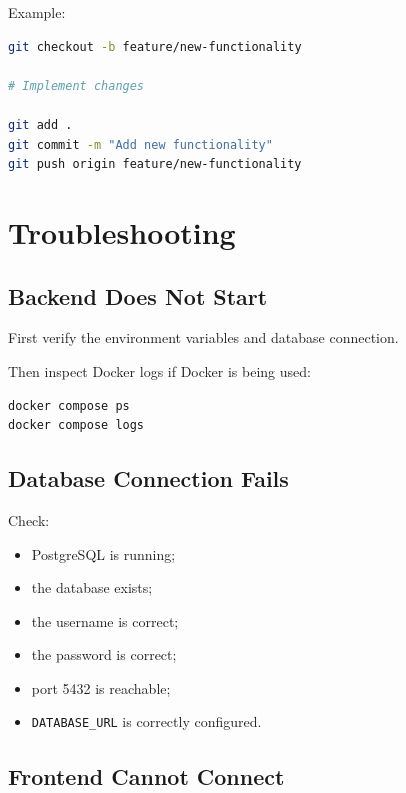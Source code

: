 \documentclass[12pt,a4paper]{article}
\begin{document}
Example:

\begin{lstlisting}[language=bash]
git checkout -b feature/new-functionality

# Implement changes

git add .
git commit -m "Add new functionality"
git push origin feature/new-functionality
\end{lstlisting}


\section{Troubleshooting}

\subsection{Backend Does Not Start}

First verify the environment variables and database connection.

Then inspect Docker logs if Docker is being used:

\begin{lstlisting}[language=bash]
docker compose ps
docker compose logs
\end{lstlisting}

\subsection{Database Connection Fails}

Check:

\begin{itemize}
    \item PostgreSQL is running;
    \item the database exists;
    \item the username is correct;
    \item the password is correct;
    \item port 5432 is reachable;
    \item \texttt{DATABASE\_URL} is correctly configured.
\end{itemize}

\subsection{Frontend Cannot Connect}
\end{document}
